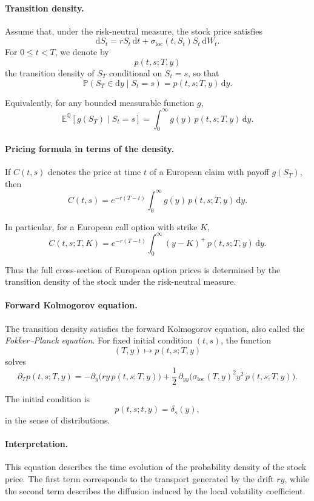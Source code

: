 \documentclass[11pt]{article}
\newcommand{\Pbb}{\mathbb{P}}
\newcommand{\Qbb}{\mathbb{Q}}
\newcommand{\E}{\mathbb{E}}
\theoremstyle{plain}
\theoremstyle{definition}
\theoremstyle{remark}
\begin{document}
\paragraph{Transition density.}
Assume that, under the risk-neutral measure, the stock price satisfies
\[
\mathrm{d}S_t
=
rS_t\,\mathrm{d}t
+
\sigma_{\mathrm{loc}}(t,S_t)S_t\,\mathrm{d}W_t.
\]
For \(0\le t<T\), we denote by
\[
p(t,s;T,y)
\]
the transition density of \(S_T\) conditional on \(S_t=s\), so that
\[
\Pbb(S_T\in \mathrm{d}y\mid S_t=s)=p(t,s;T,y)\,\mathrm{d}y.
\]

Equivalently, for any bounded measurable function \(g\),
\[
\E^\Qbb[g(S_T)\mid S_t=s]
=
\int_0^\infty g(y)\,p(t,s;T,y)\,\mathrm{d}y.
\]

\paragraph{Pricing formula in terms of the density.}
If \(C(t,s)\) denotes the price at time \(t\) of a European claim with
payoff \(g(S_T)\), then
\[
C(t,s)
=
e^{-r(T-t)}
\int_0^\infty g(y)\,p(t,s;T,y)\,\mathrm{d}y.
\]

In particular, for a European call option with strike \(K\),
\[
C(t,s;T,K)
=
e^{-r(T-t)}
\int_0^\infty (y-K)^+\,p(t,s;T,y)\,\mathrm{d}y.
\]

Thus the full cross-section of European option prices is determined by
the transition density of the stock under the risk-neutral measure.

\paragraph{Forward Kolmogorov equation.}
The transition density satisfies the forward Kolmogorov equation, also
called the \emph{Fokker--Planck equation}.
For fixed initial condition \((t,s)\), the function
\[
(T,y)\longmapsto p(t,s;T,y)
\]
solves
\[
\boxed{
\partial_T p(t,s;T,y)
=
-\partial_y\big(ry\,p(t,s;T,y)\big)
+
\frac12\,\partial_{yy}\!\Big(\sigma_{\mathrm{loc}}(T,y)^2y^2\,p(t,s;T,y)\Big).
}
\]

The initial condition is
\[
p(t,s;t,y)=\delta_s(y),
\]
in the sense of distributions.

\paragraph{Interpretation.}
This equation describes the time evolution of the probability density of
the stock price.
The first term corresponds to the transport generated by the drift
\(ry\), while the second term describes the diffusion induced by the
local volatility coefficient.
\end{document}

